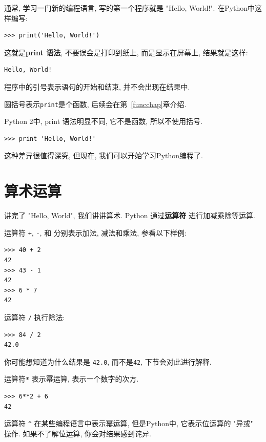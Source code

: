 \documentclass[10pt]{book}
\begin{document}
通常, 学习一门新的编程语言, 写的第一个程序就是 "Hello, World!". 
在Python中这样编写:

\begin{verbatim}
>>> print('Hello, World!')
\end{verbatim}
%

这就是{\bf print 语法}, 不要误会是打印到纸上, 而是显示在屏幕上, 
结果就是这样:

\begin{verbatim}
Hello, World!
\end{verbatim}
%

程序中的引号表示语句的开始和结束, 并不会出现在结果中. 

圆括号表示{\tt print}是个函数, 后续会在第~\ref{funcchap}章介绍. 
 

Python 2中, print 语法明显不同, 它不是函数, 所以不使用括号. 

\begin{verbatim}
>>> print 'Hello, World!'
\end{verbatim}
%
这种差异很值得深究, 
但现在, 我们可以开始学习Python编程了. 


\section{算术运算}

讲完了 "Hello, World", 我们讲讲算术. Python 通过{\bf 运算符} 
进行加减乘除等运算. 

运算符 {\tt +}, {\tt -}, 和 {\tt *} 分别表示加法, 减法和乘法, 参看以下样例:

\begin{verbatim}
>>> 40 + 2
42
>>> 43 - 1
42
>>> 6 * 7
42
\end{verbatim}
%
运算符 {\tt /} 执行除法:

\begin{verbatim}
>>> 84 / 2
42.0
\end{verbatim}
%

你可能想知道为什么结果是 {\tt 42.0}, 而不是{\tt 42}, 下节会对此进行解释. 

运算符{\tt **} 表示幂运算, 表示一个数字的次方. 

\begin{verbatim}
>>> 6**2 + 6
42
\end{verbatim}
%

运算符 \verb"^" 在某些编程语言中表示幂运算, 但是Python中, 
它表示位运算的 "异或" 操作. 如果不了解位运算, 你会对结果感到诧异. 
\end{document}

